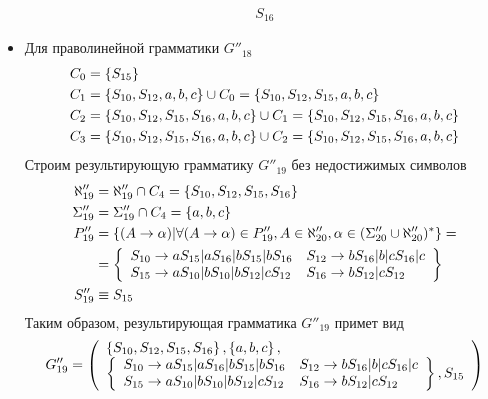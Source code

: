 \begin{itemize}
\begin{align*}
{		      }{S_{16}}
	      \end{align*}
	\item Для праволинейной грамматики \(G''_{18}\)
	      \begin{align*}
		      C_{0} & = \left\{S_{15}\right\}                                                                                             \\
		      C_{1} & = \left\{S_{10}, S_{12}, a, b, c\right\} \cup C_{0} = \left\{S_{10}, S_{12}, S_{15}, a, b, c\right\}                         \\
		      C_{2} & = \left\{S_{10}, S_{12}, S_{15}, S_{16}, a, b, c\right\} \cup C_{1} = \left\{S_{10}, S_{12}, S_{15}, S_{16}, a, b, c\right\} \\
		      C_{3} & = \left\{S_{10}, S_{12}, S_{15}, S_{16}, a, b, c\right\} \cup C_{2} = \left\{S_{10}, S_{12}, S_{15}, S_{16}, a, b, c\right\}
	      \end{align*}
	      Строим результирующую грамматику \(G''_{19}\) без недостижимых символов
	      \begin{align*}
		      \aleph''_{19} & = \aleph''_{19} \cap C_{4} = \left\{S_{10}, S_{12}, S_{15}, S_{16}\right\}                                                                \\
		      \Sigma''_{19} & = \Sigma''_{19} \cap C_{4} = \left\{a, b, c\right\}                                                                                       \\
		      P''_{19}      & = \left\{(A \to \alpha) | \forall (A\to\alpha)\in P''_{19},A\in \aleph''_{20}, \alpha \in (\Sigma''_{20} \cup  \aleph''_{20})^*\right\} = \\
		                    & = \left\{\begin{array}{ll}
				                             S_{10} \to aS_{15}|aS_{16}|bS_{15}|bS_{16} & S_{12} \to bS_{16}|b|cS_{16}|c \\
				                             S_{15} \to aS_{10}|bS_{10}|bS_{12}|cS_{12} & S_{16} \to bS_{12}|cS_{12}
			                             \end{array}\right\}                                               \\
		      S''_{19}      & \equiv S_{15}
	      \end{align*}
	      Таким образом, результирующая грамматика \(G''_{19}\) примет вид
	      \begin{align*}
		      G''_{19} = \grammatics{S_{10}, S_{12}, S_{15}, S_{16}}{\cbr{a, b, c}}{%
		      S_{10} \to aS_{15}|aS_{16}|bS_{15}|bS_{16} & S_{12} \to bS_{16}|b|cS_{16}|c \\
		      S_{15} \to aS_{10}|bS_{10}|bS_{12}|cS_{12} & S_{16} \to bS_{12}|cS_{12}
		      }{S_{15}}
	      \end{align*}
\end{itemize}
